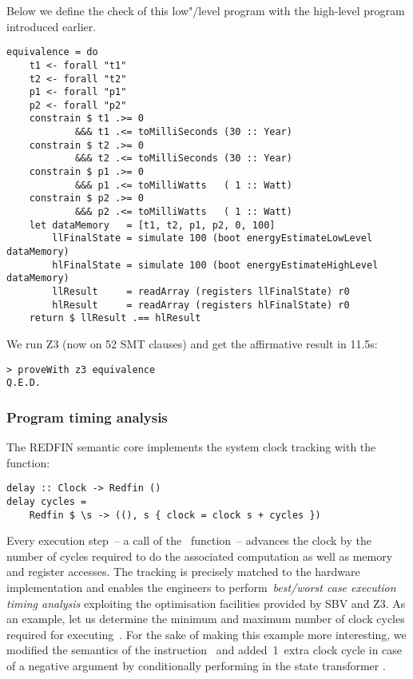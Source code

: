\noindent
Below we define the  check of this low"/level program with the
high-level program  introduced earlier.


\begin{verbatim}
equivalence = do
    t1 <- forall "t1"
    t2 <- forall "t2"
    p1 <- forall "p1"
    p2 <- forall "p2"
    constrain $ t1 .>= 0
            &&& t1 .<= toMilliSeconds (30 :: Year)
    constrain $ t2 .>= 0
            &&& t2 .<= toMilliSeconds (30 :: Year)
    constrain $ p1 .>= 0
            &&& p1 .<= toMilliWatts   ( 1 :: Watt)
    constrain $ p2 .>= 0
            &&& p2 .<= toMilliWatts   ( 1 :: Watt)
    let dataMemory   = [t1, t2, p1, p2, 0, 100]
        llFinalState = simulate 100 (boot energyEstimateLowLevel  dataMemory)
        hlFinalState = simulate 100 (boot energyEstimateHighLevel dataMemory)
        llResult     = readArray (registers llFinalState) r0
        hlResult     = readArray (registers hlFinalState) r0
    return $ llResult .== hlResult
\end{verbatim}


\noindent
We run Z3 (now on 52 SMT clauses) and get the affirmative result in 11.5s:


\begin{verbatim}
> proveWith z3 equivalence
Q.E.D.
\end{verbatim}



\subsubsection{Program timing analysis}

The REDFIN semantic core implements the system clock tracking with the~
function:


\begin{verbatim}
delay :: Clock -> Redfin ()
delay cycles =
    Redfin $ \s -> ((), s { clock = clock s + cycles })
\end{verbatim}

Every execution step~-- a call of the~ function~-- advances
the clock by the number of cycles required to do the associated computation as well
as memory and register accesses. The tracking is precisely matched to the hardware
implementation and enables the engineers to
perform~\emph{best/worst case execution timing analysis} exploiting the
optimisation facilities provided by SBV and Z3. As an example, let us determine
the minimum and maximum number of clock cycles required for
executing~. For the sake of making this example more
interesting, we modified the semantics of the instruction~ and
added~1~extra clock cycle in case of a negative argument by conditionally performing
 in the state transformer .


